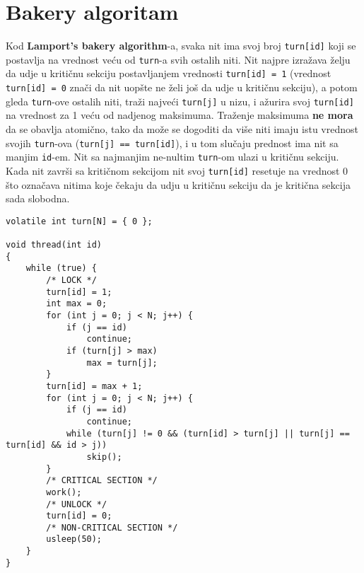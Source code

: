 \clearpage
\section{Bakery algoritam}
Kod \textbf{Lamport's bakery algorithm}-a, svaka nit ima svoj broj \texttt{turn[id]} koji se postavlja na vrednost ve\'{c}u od \texttt{turn}-a svih ostalih niti. Nit najpre izra\v{z}ava \v{z}elju da udje u kriti\v{c}nu sekciju postavljanjem vrednosti \texttt{turn[id] = 1} (vrednost \texttt{turn[id] = 0} zna\v{c}i da nit uop\v{s}te ne \v{z}eli jo\v{s} da udje u kriti\v{c}nu sekciju), a potom gleda \texttt{turn}-ove ostalih niti, tra\v{z}i najve\'{c}i \texttt{turn[j]} u nizu, i a\v{z}urira svoj \texttt{turn[id]} na vrednost za 1 ve\'{c}u od nadjenog maksimuma. Tra\v{z}enje maksimuma \textbf{ne mora} da se obavlja atomi\v{c}no, tako da mo\v{z}e se dogoditi da vi\v{s}e niti imaju istu vrednost svojih \texttt{turn}-ova (\texttt{turn[j] == turn[id]}), i u tom slu\v{c}aju prednost ima nit sa manjim \texttt{id}-em. Nit sa najmanjim ne-nultim \texttt{turn}-om ulazi u kriti\v{c}nu sekciju. Kada nit zavr\v{s}i sa kriti\v{c}nom sekcijom nit svoj \texttt{turn[id]} resetuje na vrednost 0 \v{s}to ozna\v{c}ava nitima koje \v{c}ekaju da udju u kriti\v{c}nu sekciju da je kriti\v{c}na sekcija sada slobodna.
\begin{lstlisting}
volatile int turn[N] = { 0 };

void thread(int id)
{
    while (true) {
        /* LOCK */
        turn[id] = 1;
        int max = 0;
        for (int j = 0; j < N; j++) {
            if (j == id)
                continue;
            if (turn[j] > max)
                max = turn[j];
        }
        turn[id] = max + 1;
        for (int j = 0; j < N; j++) {
            if (j == id)
                continue;
            while (turn[j] != 0 && (turn[id] > turn[j] || turn[j] == turn[id] && id > j))
                skip();
        }
        /* CRITICAL SECTION */
        work();
        /* UNLOCK */
        turn[id] = 0;
        /* NON-CRITICAL SECTION */
        usleep(50);
    }
}
\end{lstlisting}